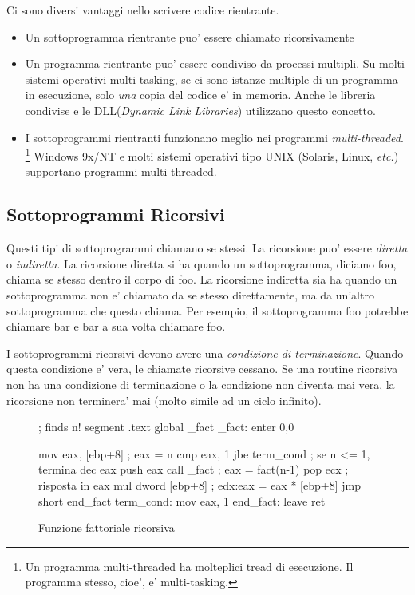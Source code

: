 Ci sono diversi vantaggi nello scrivere codice rientrante.
\begin{itemize}
\item Un sottoprogramma rientrante puo' essere chiamato ricorsivamente
\item Un programma rientrante puo' essere condiviso da processi multipli.
Su molti sistemi operativi multi-tasking, se ci sono istanze multiple di
un programma in esecuzione, solo \emph{una} copia del codice e' in memoria.
Anche le libreria condivise e le DLL(\emph{Dynamic Link Libraries}) utilizzano
questo concetto.
\item I sottoprogrammi rientranti funzionano meglio nei programmi \emph{multi-threaded}.
\footnote{Un programma multi-threaded ha molteplici tread di esecuzione. Il 
programma stesso, cioe', e' multi-tasking.} Windows 9x/NT e molti sistemi
operativi tipo UNIX (Solaris, Linux, \emph{etc.}) supportano programmi
multi-threaded.
\end{itemize}

\subsection{Sottoprogrammi Ricorsivi}

Questi tipi di sottoprogrammi chiamano se stessi. La ricorsione puo' essere
\emph{diretta} o \emph{indiretta}. La ricorsione diretta si ha quando un 
sottoprogramma, diciamo {\code foo}, chiama se stesso dentro il corpo di
{\code foo}. La ricorsione indiretta sia ha quando un sottoprogramma non 
e' chiamato da se stesso direttamente, ma da un'altro sottoprogramma che questo
chiama. Per esempio, il sottoprogramma {\code foo} potrebbe chiamare
{\code bar} e {\code bar} a sua volta chiamare {\code foo}.  
 
I sottoprogrammi ricorsivi devono avere una \emph{condizione di terminazione}.
Quando questa condizione e' vera, le chiamate ricorsive cessano. Se una
routine ricorsiva non ha una condizione di terminazione o la condizione
non diventa mai vera, la ricorsione non terminera' mai (molto simile ad
un ciclo infinito).

\begin{figure}
\begin{AsmCodeListing}[frame=single]
; finds n!
segment .text
      global _fact
_fact:
      enter  0,0

      mov    eax, [ebp+8]    ; eax = n
      cmp    eax, 1
      jbe    term_cond       ; se n <= 1, termina
      dec    eax
      push   eax
      call   _fact           ; eax = fact(n-1)
      pop    ecx             ; risposta in eax
      mul    dword [ebp+8]   ; edx:eax = eax * [ebp+8]
      jmp    short end_fact
term_cond:
      mov    eax, 1
end_fact:
      leave
      ret
\end{AsmCodeListing}
\caption{Funzione fattoriale ricorsiva \label{fig:factorial}}
\end{figure}

